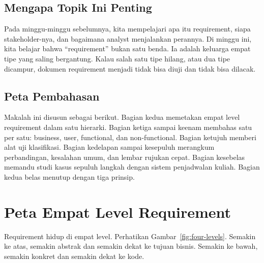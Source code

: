 \documentclass[11pt,a4paper]{article}
\begin{document}
\subsection{Mengapa Topik Ini Penting}

Pada minggu-minggu sebelumnya, kita mempelajari apa itu requirement, siapa stakeholder-nya, dan bagaimana analyst menjalankan perannya. Di minggu ini, kita belajar bahwa ``requirement'' bukan satu benda. Ia adalah keluarga empat tipe yang saling bergantung. Kalau salah satu tipe hilang, atau dua tipe dicampur, dokumen requirement menjadi tidak bisa diuji dan tidak bisa dilacak.

\subsection{Peta Pembahasan}

Makalah ini disusun sebagai berikut. Bagian kedua memetakan empat level requirement dalam satu hierarki. Bagian ketiga sampai keenam membahas satu per satu: business, user, functional, dan non-functional. Bagian ketujuh memberi alat uji klasifikasi. Bagian kedelapan sampai kesepuluh merangkum perbandingan, kesalahan umum, dan lembar rujukan cepat. Bagian kesebelas memandu studi kasus sepuluh langkah dengan sistem penjadwalan kuliah. Bagian kedua belas menutup dengan tiga prinsip.

\section{Peta Empat Level Requirement}

Requirement hidup di empat level. Perhatikan Gambar~\ref{fig:four-levels}. Semakin ke atas, semakin abstrak dan semakin dekat ke tujuan bisnis. Semakin ke bawah, semakin konkret dan semakin dekat ke kode.
\end{document}
